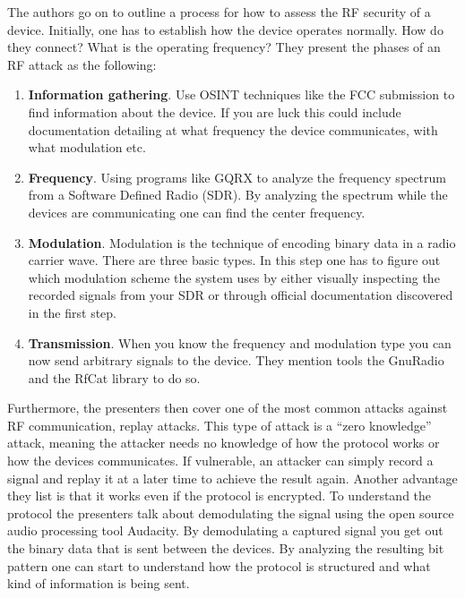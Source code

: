 The authors go on to outline a process for how to assess the RF security of a device. Initially, one has to establish how the device operates normally. How do they connect? What is the operating frequency? They present the phases of an RF attack as the following:
\begin{enumerate}
    \item \textbf{Information gathering}. Use \gls{OSINT} techniques like the FCC submission to find information about the device. If you are luck this could include documentation detailing at what frequency the device communicates, with what modulation etc.
    
    \item \textbf{Frequency}. Using programs like GQRX to analyze the frequency spectrum from a Software Defined Radio (SDR). By analyzing the spectrum while the devices are communicating one can find the center frequency.
    
    \item \textbf{Modulation}. Modulation is the technique of encoding binary data in a radio carrier wave. There are three basic types. In this step one has to figure out which modulation scheme the system uses by either visually inspecting the recorded signals from your SDR or through official documentation discovered in the first step.
    
    \item \textbf{Transmission}. When you know the frequency and modulation type you can now send arbitrary signals to the device. They mention tools the GnuRadio and the RfCat library to do so.
\end{enumerate}
Furthermore, the presenters then cover one of the most common attacks against RF communication, replay attacks. This type of attack is a \enquote{zero knowledge} attack, meaning the attacker needs no knowledge of how the protocol works or how the devices communicates. If vulnerable, an attacker can simply record a signal and replay it at a later time to achieve the result again. Another advantage they list is that it works even if the protocol is encrypted. To understand the protocol the presenters talk about demodulating the signal using the open source audio processing tool Audacity. By demodulating a captured signal you get out the binary data that is sent between the devices. By analyzing the resulting bit pattern one can start to understand how the protocol is structured and what kind of information is being sent.

